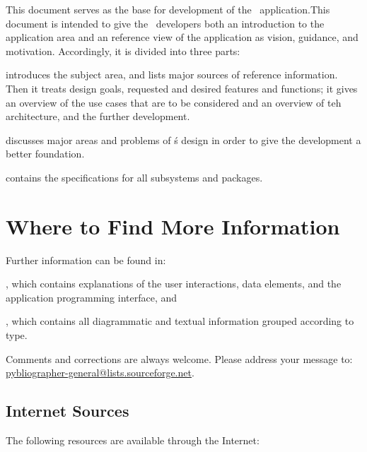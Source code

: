 \label{cha:preface}

This document serves as the base for development of the \Pyb\
application.This document is intended to give the \Pyb\ developers both an
introduction to the application area and an reference view of the
application as vision, guidance, and motivation.  Accordingly, it is
divided into three parts:

\begin{description*}
\item [Part 1, Overview] introduces the subject area, and lists major
  sources of reference information. Then it treats design goals,
  requested and desired features and functions; it gives an overview
  of the use cases that are to be considered and an overview of teh
  architecture, and the further development.
\item [Part 2, Design Considerations] discusses major areas and
  problems of \Pyb\'s  design  in order to give the development a
  better foundation. 
\item [Part 3, Component Spacifications] contains the specifications
  for all subsystems and packages.
\end{description*}


\section{Where to Find More Information}
\label{sec:prefmore}

 Further information can be found in:
\begin{itemize*}
\item \UG, which contains explanations of the user interactions, data
  elements, and the application programming interface, and
\item \RM, which contains all
  diagrammatic and textual information grouped according to type.
\end{itemize*}

\noindent

\begin{dnote}[Comments:]
\item Comments and corrections are always welcome.
  Please address your message to:
  \url{pybliographer-general@lists.sourceforge.net}.
\end{dnote}


\subsection{Internet Sources}
\label{sec:prefinet}
The following resources are available through the Internet:

